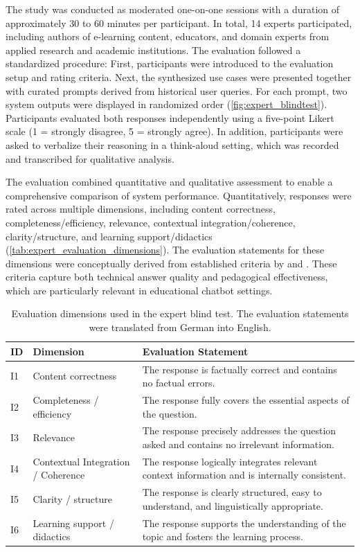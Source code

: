 The study was conducted as moderated one-on-one sessions with a duration of approximately 30 to 60 minutes per participant. In total, 14 experts participated, including authors of e-learning content, educators, and domain experts from applied research and academic institutions. The evaluation followed a standardized procedure: First, participants were introduced to the evaluation setup and rating criteria. Next, the synthesized use cases were presented together with curated prompts derived from historical user queries. For each prompt, two system outputs were displayed in randomized order (\autoref{fig:expert_blindtest}). Participants evaluated both responses independently using a five-point Likert scale (1 = strongly disagree, 5 = strongly agree). In addition, participants were asked to verbalize their reasoning in a think-aloud setting, which was recorded and transcribed for qualitative analysis.

The evaluation combined quantitative and qualitative assessment to enable a comprehensive comparison of system performance. Quantitatively, responses were rated across multiple dimensions, including content correctness, completeness/efficiency, relevance, contextual integration/coherence, clarity/structure, and learning support/didactics (\autoref{tab:expert_evaluation_dimensions}). The evaluation statements for these dimensions were conceptually derived from established criteria by \autocite{neumann2025llm} and \autocite{hmoud2024rubric}. These criteria capture both technical answer quality and pedagogical effectiveness, which are particularly relevant in educational chatbot settings.

\begin{table}[H]
\centering
\renewcommand{\arraystretch}{1.2}
\begin{tabularx}{\linewidth}{l l X}
\toprule
\textbf{ID} & \textbf{Dimension} & \textbf{Evaluation Statement} \\
\midrule
I1 & Content correctness & The response is factually correct and contains no factual errors. \\
I2 & Completeness / efficiency & The response fully covers the essential aspects of the question. \\
I3 & Relevance & The response precisely addresses the question asked and contains no irrelevant information. \\
I4 & Contextual Integration / Coherence & The response logically integrates relevant context information and is internally consistent. \\
I5 & Clarity / structure & The response is clearly structured, easy to understand, and linguistically appropriate. \\
I6 & Learning support / didactics & The response supports the understanding of the topic and fosters the learning process. \\
\bottomrule
\end{tabularx}
\caption{Evaluation dimensions used in the expert blind test. The evaluation statements were translated from German into English.}
\label{tab:expert_evaluation_dimensions}
\end{table}

